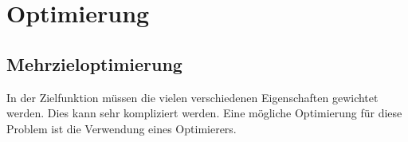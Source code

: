 \section{Optimierung}\label{sec:optimierung}
\subsection{Mehrzieloptimierung}
In der Zielfunktion müssen die vielen verschiedenen Eigenschaften gewichtet werden. 
Dies kann sehr kompliziert werden. Eine mögliche Optimierung für diese Problem ist die 
Verwendung eines Optimierers.

